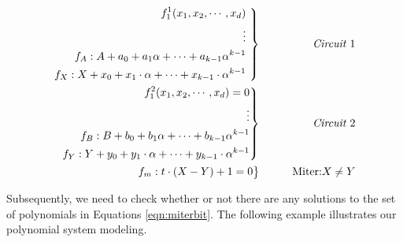 \begin{eqnarray}\label{eqn:miterbit}
 \left .  \begin{aligned}
f_1^{1}(x_1,x_2,\cdots, x_d)  \\
\vdots  \\
f_A: A + a_0 +  a_1 \alpha + \dots + a_{k-1}\alpha^{k-1}\\
f_{X}: X+x_{0}+x_{1}\cdot \alpha+\dots+ x_{k-1}\cdot \alpha^{k-1} \\
 \end{aligned} 
\ \right\}
 &\qquad&  \text{\it Circuit $1$} \nonumber \\
 \left . \begin{aligned}
f_1^{2}(x_1,x_2,\cdots, x_d)=0  \\
\vdots  \\
f_B: B + b_0 +  b_1 \alpha + \dots + b_{k-1}\alpha^{k-1}\\
f_{Y}: Y+y_{0}+y_{1}\cdot \alpha+\dots+ y_{k-1}\cdot \alpha^{k-1} \\
 \end{aligned} 
\right\}
 &\qquad&  \text{\it  Circuit $2$}  \\
 \left .  \begin{aligned}
f_{m}:t\cdot (X-Y)+1=0  \nonumber 
 \end{aligned} 
\right\}
 &\qquad& \text{Miter:}X \neq Y \nonumber 
\end{eqnarray}

Subsequently, we need to check whether or not there are any solutions
to the set of polynomials in Equations \ref{eqn:miterbit}. The
following example illustrates our polynomial system 
modeling. 

